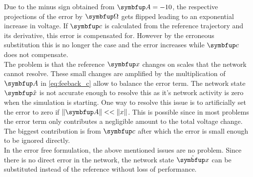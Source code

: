 Due to the minus sign obtained from $\bmu{A} = -10$, the respective projections of the error by $\bmu{\Omega}$ gets flipped leading to an exponential increase in voltage. If $\bmu{c}$ is calculated from the reference trajectory and its derivative, this error is compensated for. However by the erroneous substitution this is no longer the case and the error increases while $\bmu{c}$ does not compensate.\\
The problem is that the reference $\bmu{x}$ changes on scales that the network cannot resolve. These small changes are amplified by the multiplication of $\bmu{A}$ in \cref{eq:feeback_c} allow to balance the error term. The network state $\bmu{\hat{x}}$ is not accurate enough to resolve this as it's network activity is zero when the simulation is starting.
One way to resolve this issue is to artificially set the error to zero if $\|\bmu{A}\|<<\|x\|$. This is possible since in most problems the error term only contributes a negligible amount to the total voltage change. The biggest contribution is from $\bmu{c}$ after which the error is small enough to be ignored directly.\\
In the error free formulation, the above mentioned issues are no problem. Since there is no direct error in the network, the network state $\hat{\bmu{x}}$ can be substituted instead of the reference without loss of performance.\\

